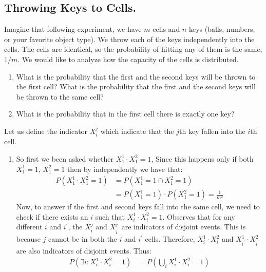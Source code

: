   \subsection{ Throwing Keys to Cells. }  
  \begin{example} Imagine that following experiment, we have $m$ cells and $n$ keys (balls, numbers, or your favorite object type). We throw each of the keys independently into the cells. The cells are identical, so the probability of hitting any of them is the same, $1/m$. We would like to analyze how the capacity of the cells is distributed.
    \begin{enumerate}
      \item What is the probability that the first and the second keys will be thrown to the first cell? What is the probability that the first and the second keys will be thrown to the same cell? 
      \item What is the probability that in the first cell there is exactly one key? 
    \end{enumerate}
    Let us define the indicator $X_{i}^{j}$ which indicate that the $j$th key fallen into the $i$th cell. 
    \begin{enumerate}
      \item So first we been asked whether $X_{1}^{1}\cdot  X_{1}^{2} = 1$, Since this happens only if both $X_{1}^{1} = 1$, $X_{1}^{2} = 1$ then by independently we have that: 
        \begin{equation*}
          \begin{split}
            P({X_{1}^{1}\cdot  X_{1}^{2} = 1}) &= P(X_{1}^{1} = 1 \cap  X_{1}^{2} = 1) \\
            & = P(X_{1}^{1} = 1 ) \cdot P( X_{1}^{2} = 1) =\frac{1}{m^2}
          \end{split}
        \end{equation*} Now, to answer if the first and second keys fall into the same cell, we need to check if there exists an $i$ such that $X_{i}^{1}\cdot X_{i}^{2} = 1$. Observes that for any different $i$ and $i^{\prime}$, the $X_{i}^{j}$ and $X_{i^{\prime}}^{j}$ are indicators of disjoint events. This is because $j$ cannot be in both the $i$ and $i^{\prime}$ cells. Therefore, $X_{i}^{1}\cdot X_{i}^{2}$ and $X_{i^{\prime}}^{1}\cdot X_{i^{\prime}}^{2}$ are also indicators of disjoint events. Thus: 
        \begin{equation*}
          \begin{split}
            P(\exists i : X_{i}^1 \cdot X_{i}^{2} = 1) &= P( \bigcup_{i} X_{i}^1 \cdot X_{i}^{2} = 1) \\

\end{split}
\end{equation*}
\end{enumerate}
\end{example}
